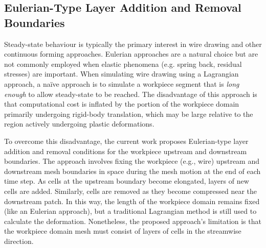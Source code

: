 \documentclass[sn-mathphys,Numbered]{sn-jnl}%
\begin{document}
\subsection{Eulerian-Type Layer Addition and Removal Boundaries} \label{sec:euler_BCs}

Steady-state behaviour is typically the primary interest in wire drawing and other continuous forming approaches.
Eulerian approaches are a natural choice but are not commonly employed when elastic phenomena (e.g. spring back, residual stresses) are important.
When simulating wire drawing using a Lagrangian approach, a na\"ive approach is to simulate a workpiece segment that is \emph{long enough} to allow steady-state to be reached.
The disadvantage of this approach is that computational cost is inflated by the portion of the workpiece domain primarily undergoing rigid-body translation, which may be large relative to the region actively undergoing plastic deformations.

To overcome this disadvantage, the current work proposes Eulerian-type layer addition and removal conditions for the workpiece upstream and downstream boundaries.
The approach involves fixing the workpiece (e.g., wire) upstream and downstream mesh boundaries in space during the mesh motion at the end of each time step.
As cells at the upstream boundary become elongated, layers of new cells are added.
Similarly, cells are removed as they become compressed near the downstream patch.
In this way, the length of the workpiece domain remains fixed (like an Eulerian approach), but a traditional Lagrangian method is still used to calculate the deformation.
Nonetheless, the proposed approach's limitation is that the workpiece domain mesh must consist of layers of cells in the streamwise direction.
\end{document}
